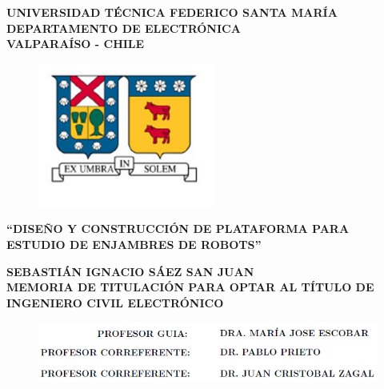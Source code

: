 \documentclass[11pt, a4paper, oneside]{Thesis} %
\begin{document}
\begin{center}
\linespread{1.15}
\textbf{\large{UNIVERSIDAD TÉCNICA FEDERICO SANTA MARÍA\\}
\normalsize{DEPARTAMENTO DE ELECTRÓNICA\\VALPARAÍSO - CHILE\\}}

\vspace{0.5cm}
\begin{figure}[!ht]
\centering
  \includegraphics[width=5.85cm]{./Figures/usmLogo.png}
\end{figure}
\vspace{0.5cm}

\linespread{1}\hangindent=0cm
\textbf{\Large ``DISEÑO Y CONSTRUCCIÓN DE PLATAFORMA PARA ESTUDIO DE ENJAMBRES DE ROBOTS''\\}
\vspace{3cm}

\hangindent=0cm\large \textbf{SEBASTIÁN IGNACIO SÁEZ SAN JUAN}\\
\vspace{0.5cm}
\hangindent=0cm\normalsize \textbf{MEMORIA DE TITULACIÓN PARA OPTAR AL TÍTULO DE INGENIERO CIVIL ELECTRÓNICO}\\
\vspace{3cm}

\vspace{0.5cm}
\begin{figure}[!ht]
\centering
  \includegraphics[width=\textwidth]{./Figures/profesores.png}
\end{figure}
\vspace{0.5cm}



\end{center}
\end{document}
